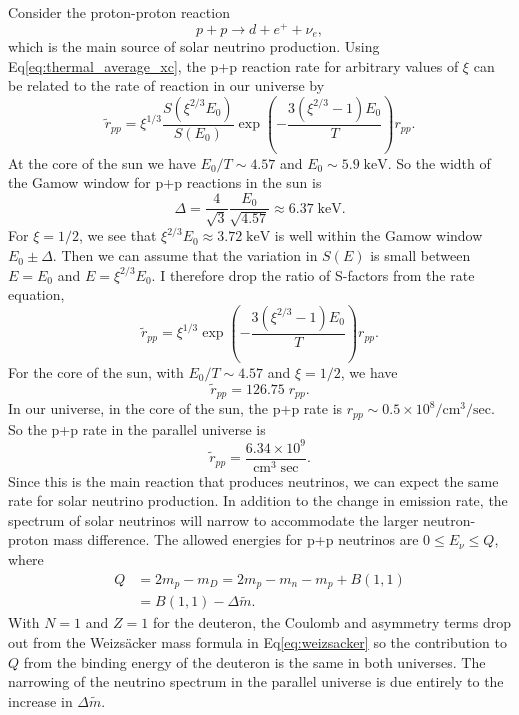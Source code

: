 \documentclass[%
 reprint,
 amsmath,amssymb,
 aps,
]{revtex4-1}
\begin{document}
Consider the proton-proton reaction
\begin{equation}
    p + p \rightarrow d + e^{+} + \nu_e,
\end{equation}
which is the main source of solar neutrino production. Using Eq\eqref{eq:thermal_average_xc}, the p+p reaction rate for arbitrary values of $\xi$ can be related to the rate of reaction in our universe by
\begin{equation}
    \widetilde{r}_{pp} = \xi^{1/3} \frac{S(\xi^{2/3} E_0)}{S(E_0)}
    \exp \left( - \frac{3 (\xi^{2/3} - 1) E_0}{T} \right)
    r_{pp}.
\end{equation}
At the core of the sun we have $E_0 / T \sim 4.57$ and $E_0 \sim 5.9 \; \text{keV}$.\cite{HaxtonLectureNotes}
So the width of the Gamow window for p+p reactions in the sun is
\begin{equation}
    \Delta = \frac{4}{\sqrt{3}} \frac{E_0}{\sqrt{4.57}}
    \approx 6.37 \; \text{keV}.
\end{equation}
For $\xi = 1/2$, we see that $\xi^{2/3} E_0 \approx 3.72 \; \text{keV}$ is well within the Gamow window $E_0 \pm \Delta$. Then we can assume that the variation in $S(E)$ is small between $E = E_0$ and $E = \xi^{2/3} E_0$. I therefore drop the ratio of S-factors from the rate equation,
\begin{equation}
    \widetilde{r}_{pp} = \xi^{1/3}
    \exp \left( - \frac{3 (\xi^{2/3} - 1) E_0}{T} \right)
    r_{pp}.
\end{equation}
For the core of the sun, with $E_0 / T \sim 4.57$ and $\xi = 1/2$, we have
\begin{equation}
    \widetilde{r}_{pp} = 126.75 \; r_{pp}.
    \label{eq:rpp_ratio}
\end{equation}
In our universe, in the core of the sun, the p+p rate is $r_{pp} \sim 0.5 \times 10^8 / \text{cm}^3 / \text{sec}$.\cite{HaxtonLectureNotes} So the p+p rate in the parallel universe is
\begin{equation}
    \widetilde{r}_{pp} = \frac{6.34 \times 10^9}{\text{cm}^3 \; \text{sec}}.
\end{equation}
Since this is the main reaction that produces neutrinos, we can expect the same rate for solar neutrino production. In addition to the change in emission rate, the spectrum of solar neutrinos will narrow to accommodate the larger neutron-proton mass difference. The allowed energies for p+p neutrinos are $0 \le E_\nu \le Q$, where
\begin{align}
	Q &= 2 m_p - m_D = 2 m_p - m_n - m_p + B(1, 1) \\
	&= B(1, 1) - \Delta \widetilde{m}.
\end{align}
With $N = 1$ and $Z = 1$ for the deuteron, the Coulomb and asymmetry terms drop out from the Weizs\"acker mass formula in Eq\eqref{eq:weizsacker} so the contribution to $Q$ from the binding energy of the deuteron is the same in both universes. The narrowing of the neutrino spectrum in the parallel universe is due entirely to the increase in $\Delta \widetilde{m}$.
\end{document}
